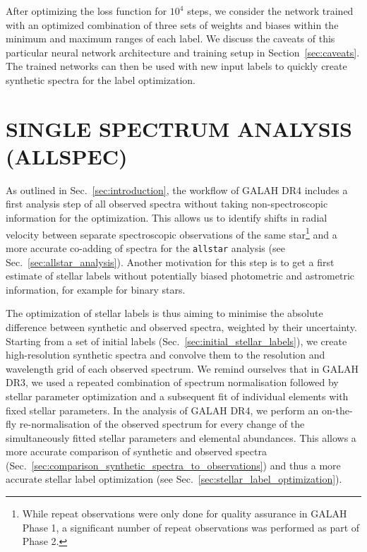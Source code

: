 \documentclass[
  journal=pasa,
  manuscript=research-paper, %
  year=2024,
  volume=37
]{cup-journal}
\begin{document}
After optimizing the loss function for $10^4$ steps, we consider the network trained with an optimized combination of three sets of weights and biases within the minimum and maximum ranges of each label. We discuss the caveats of this particular neural network architecture and training setup in Section~\ref{sec:caveats}. The trained networks can then be used with new input labels to quickly create synthetic spectra for the label optimization.

\section{SINGLE SPECTRUM ANALYSIS (ALLSPEC)}
\label{sec:allspec_analysis}

As outlined in Sec.~\ref{sec:introduction}, the workflow of GALAH DR4 includes a first analysis step of all observed spectra without taking non-spectroscopic information for the optimization. This allows us to identify shifts in radial velocity between separate spectroscopic observations of the same star\footnote{While repeat observations were only done for quality assurance in GALAH Phase 1, a significant number of repeat observations was performed as part of Phase 2.} and a more accurate co-adding of spectra for the \texttt{allstar} analysis (see Sec.~\ref{sec:allstar_analysis}). Another motivation for this step is to get a first estimate of stellar labels without potentially biased photometric and astrometric information, for example for binary stars.

The optimization of stellar labels is thus aiming to minimise the absolute difference between synthetic and observed spectra, weighted by their uncertainty. Starting from a set of initial labels (Sec.~\ref{sec:initial_stellar_labels}), we create high-resolution synthetic spectra and convolve them to the resolution and wavelength grid of each observed spectrum. We remind ourselves that in GALAH DR3, we used a repeated combination of spectrum normalisation followed by stellar parameter optimization and a subsequent fit of individual elements with fixed stellar parameters. In the analysis of GALAH DR4, we perform an on-the-fly re-normalisation of the observed spectrum for every change of the simultaneously fitted stellar parameters and elemental abundances. This allows a more accurate comparison of synthetic and observed spectra (Sec.~\ref{sec:comparison_synthetic_spectra_to_observations}) and thus a more accurate stellar label optimization (see Sec.~\ref{sec:stellar_label_optimization}).
\end{document}
